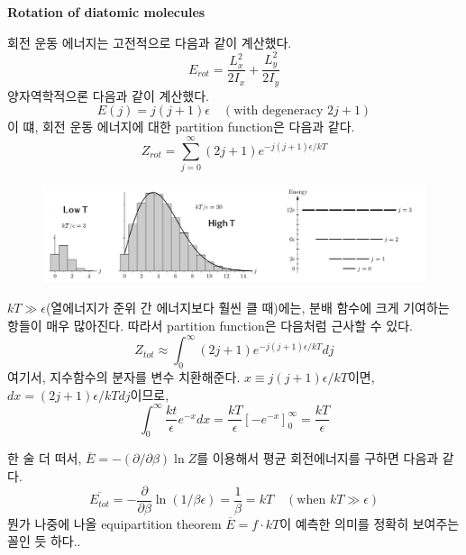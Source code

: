 \documentclass{article}
\begin{document}
\newpage

\noindent
\textbf{Rotation of diatomic molecules}

회전 운동 에너지는 고전적으로 다음과 같이 계산했다.
\begin{equation}
    E_{rot} = \frac{L_x ^2}{2I_x} + \frac{L_y ^2}{2I_y}
\end{equation}
양자역학적으론 다음과 같이 계산했다.
\begin{equation}
    E(j) = j(j+1)\epsilon \quad (\text{with degeneracy $2j+1$})
\end{equation}
이 떄, 회전 운동 에너지에 대한 partition function은 다음과 같다.
\begin{equation}
    Z_{rot} = \sum_{j=0}^{\infty} (2j+1) e^{-j(j+1)\epsilon/kT}
\end{equation}

\begin{figure}[h]
    \centering
    \includegraphics[width=1\linewidth]{images/fig2_2.png}
\end{figure}

$kT \gg \epsilon$(열에너지가 준위 간 에너지보다 훨씬 클 때)에는, 분배 함수에 크게 기여하는 항들이 매우 많아진다. 따라서 partition function은 다음처럼 근사할 수 있다.
\begin{equation}
    Z_{tot} \approx \int_0^\infty (2j+1) e^{-j(j+1) \epsilon / kT} dj
\end{equation}
여기서, 지수함수의 분자를 변수 치환해준다. $x \equiv j(j+1)\epsilon / kT$이면, $dx = (2j+1)\epsilon /kT dj$이므로,
\begin{equation}
    \int_0^\infty \frac{kt}{\epsilon} e^{-x} dx = \frac{kT}{\epsilon} [-e^{-x}]_0^\infty = \frac{kT}{\epsilon}
\end{equation}

한 술 더 떠서, $\overline{E} = -(\partial/\partial \beta) \ln Z$를 이용해서 평균 회전에너지를 구하면 다음과 같다.
\begin{equation}
    \overline{E_{tot}} = -\frac{\partial}{\partial \beta} \ln (1/\beta \epsilon) = \frac{1}{\beta} = kT \quad (\text{when }kT \gg \epsilon)
\end{equation}
뭔가 나중에 나올 equipartition theorem $\overline{E} = f \cdot kT$이 예측한 의미를 정확히 보여주는 꼴인 듯 하다..
\end{document}
